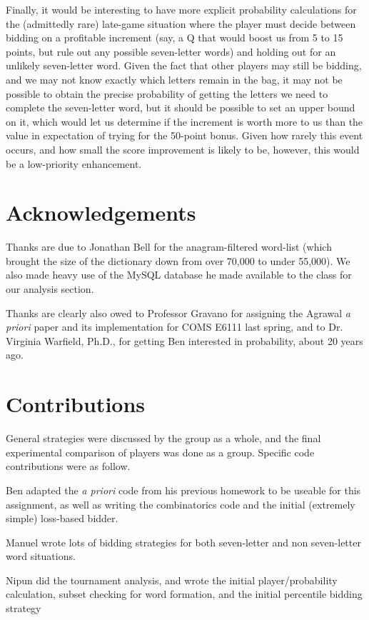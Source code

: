 \documentclass[11pt]{article}
\begin{document}
Finally, it would be interesting to have more explicit probability calculations for the (admittedly rare) late-game situation where the player must decide between bidding on a profitable increment (say, a Q that would boost us from 5 to 15 points, but rule out any possible seven-letter words) and holding out for an unlikely seven-letter word. Given the fact that other players may still be bidding, and we may not know exactly which letters remain in the bag, it may not be possible to obtain the precise probability of getting the letters we need to complete the seven-letter word, but it should be possible to set an upper bound on it, which would let us determine if the increment is worth more to us than the value in expectation of trying for the 50-point bonus.  Given how rarely this event occurs, and how small the score improvement is likely to be, however, this would be a low-priority enhancement.



\section{Acknowledgements}

Thanks are due to Jonathan Bell for the anagram-filtered word-list (which brought the size of the dictionary down from over 70,000 to under 55,000).  We also made heavy use of the MySQL database he made available to the class for our analysis section.

Thanks are clearly also owed to Professor Gravano for assigning the Agrawal {\it a priori} paper and its implementation for COMS E6111 last spring, and to Dr. Virginia Warfield, Ph.D., for getting Ben interested in probability, about 20 years ago.

\section{Contributions}
General strategies were discussed by the group as a whole, and the final experimental comparison of players was done as a group.  Specific code contributions were as follow.

Ben adapted the {\it a priori} code from his previous homework to be useable for this assignment, as well as writing the combinatorics code and the initial (extremely simple) loss-based bidder.

Manuel wrote lots of bidding strategies for both seven-letter and non seven-letter word situations.

Nipun did the tournament analysis, and wrote the initial player/probability calculation, subset checking for word formation, and the initial percentile bidding strategy
\end{document}
